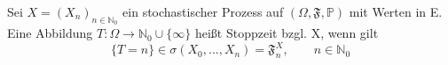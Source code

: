 Sei $X= (X_{n})_{n \in \mathbb{N}_{0}}$ ein stochastischer Prozess auf $(\Omega,\mathfrak{F},\mathbb{P})$ mit Werten in E. Eine Abbildung $T: \Omega \to \mathbb{N}_{0} \cup \lbrace \infty \rbrace $ heißt Stoppzeit bzgl. X, wenn gilt
\begin{equation*}
\lbrace T = n \rbrace \in \sigma(X_{0},...,X_{n}) = \mathfrak{F}_{n}^{X}, \qquad n \in \mathbb{N}_{0}
\end{equation*}